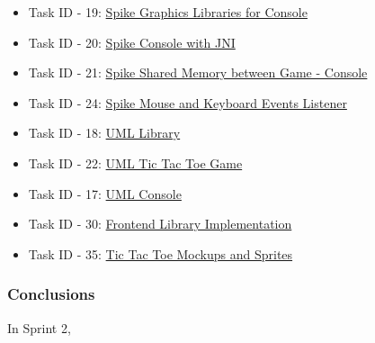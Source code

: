 \begin{itemize}
    \item Task ID - 19: \href{https://tree.taiga.io/project/joseluis-teran-coffeetime/us/19?milestone=392128}{Spike Graphics Libraries for Console}
    \item Task ID - 20: \href{https://tree.taiga.io/project/joseluis-teran-coffeetime/us/20?milestone=392128}{Spike Console with JNI}
    \item Task ID - 21: \href{https://tree.taiga.io/project/joseluis-teran-coffeetime/us/21?milestone=392128}{Spike Shared Memory between Game - Console}
    \item Task ID - 24: \href{https://tree.taiga.io/project/joseluis-teran-coffeetime/us/24?milestone=392128}{Spike Mouse and Keyboard Events Listener}
    \item Task ID - 18: \href{https://tree.taiga.io/project/joseluis-teran-coffeetime/us/18?milestone=392128}{UML Library}
    \item Task ID - 22: \href{https://tree.taiga.io/project/joseluis-teran-coffeetime/us/22?milestone=392128}{UML Tic Tac Toe Game}
    \item Task ID - 17: \href{https://tree.taiga.io/project/joseluis-teran-coffeetime/us/17?milestone=392128}{UML Console}
    \item Task ID - 30: \href{https://tree.taiga.io/project/joseluis-teran-coffeetime/us/30?milestone=392128}{Frontend Library Implementation}
    \item Task ID - 35: \href{https://tree.taiga.io/project/joseluis-teran-coffeetime/us/35?milestone=392128}{Tic Tac Toe Mockups and Sprites}    
\end{itemize}

\subsubsection{Conclusions}

In Sprint 2, 

